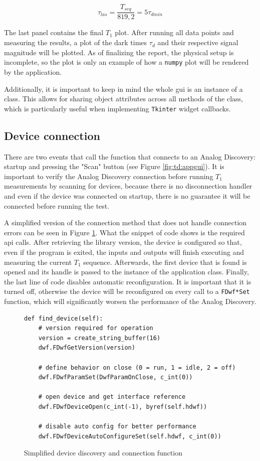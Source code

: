 \begin{equation}\label{eq:td:tlas}
	\tau_{las} = \frac{T_{seq}}{819,2} = 5\tau_{dmin}
\end{equation}

The last panel contains the final $T_1$ plot. After running all data points and measuring the results, a plot of the dark times $\tau_d$ and their respective signal magnitude will be plotted. As of finalizing the report, the physical setup is incomplete, so the plot is only an example of how a \lstinline|numpy| plot will be rendered by the application.

Additionally, it is important to keep in mind the whole \gls{gui} is an instance of a class. This allows for sharing object attributes across all methods of the class, which is particularly useful when implementing \lstinline|Tkinter| widget callbacks.

\subsection{Device connection}
There are two events that call the function that connects to an Analog Discovery: startup and pressing the "Scan" button (see Figure \ref{fig:td:appgui}). It is important to verify the Analog Discovery connection before running $T_1$ measurements by scanning for devices, because there is no disconnection handler and even if the device was connected on startup, there is no guarantee it will be connected before running the test.

A simplified version of the connection method that does not handle connection errors can be seen in Figure \ref{fig:td:find_device}. What the snippet of code shows is the required \gls{api} calls. After retrieving the library version, the device is configured so that, even if the program is exited, the inputs and outputs will finish executing and measuring the current $T_1$ sequence. Afterwards, the first device that is found is opened and its handle is passed to the instance of the application class. Finally, the last line of code disables automatic reconfiguration. It is important that it is turned off, otherwise the device will be reconfigured on every call to a \lstinline|FDwf*Set| function, which will significantly worsen the performance of the Analog Discovery.

\begin{figure}[ht]
	\begin{lstlisting}[language=pythe]
def find_device(self):
	# version required for operation
	version = create_string_buffer(16)
	dwf.FDwfGetVersion(version)
		
	# define behavior on close (0 = run, 1 = idle, 2 = off)
	dwf.FDwfParamSet(DwfParamOnClose, c_int(0))
		
	# open device and get interface reference
	dwf.FDwfDeviceOpen(c_int(-1), byref(self.hdwf))
		
	# disable auto config for better performance
	dwf.FDwfDeviceAutoConfigureSet(self.hdwf, c_int(0))
	\end{lstlisting}
	\caption{Simplified device discovery and connection function}
	\label{fig:td:find_device}
\end{figure}



